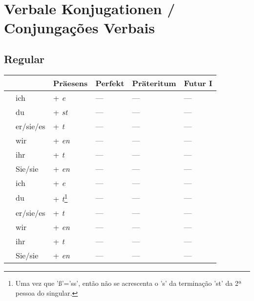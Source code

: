 \chapter{Verbale Konjugationen / Conjungações Verbais}\label{chapter:verben}

    \section{Regular}\label{section:verben:regular}

        \begin{longtabu}to 
            \toprule
            && \textbf{Präesens} & \textbf{Perfekt} & \textbf{Präteritum} & \textbf{Futur I}\\ \toprule \endhead
                & ich &  + \textit{e} & --- & --- & ---\\ \hline
                & du &  + \textit{st} & --- & --- & ---\\ \hline
                & er/sie/es &  + \textit{t} & --- & --- & ---\\ \hline
                & wir &  + \textit{en} & --- & --- & ---\\ \hline
                & ihr &  + \textit{t} & --- & --- & ---\\ \hline
                & Sie/sie &  + \textit{en} & --- & --- & ---\\ \hline
            \toprule
                 & ich &  + \textit{e} & --- & --- & ---\\ 
                & du &  + \textit{t}\footnote{Uma vez que 'ß'='ss', então não se acrescenta o 's' da terminação 'st' da 2ª pessoa do singular.} & --- & --- & ---\\ 
                & er/sie/es &  + \textit{t} & --- & --- & ---\\ 
                & wir &  + \textit{en} & --- & --- & ---\\ 
                & ihr &  + \textit{t} & --- & --- & ---\\ 
                & Sie/sie &  + \textit{en} & --- & --- & ---\\ 

\end{longtabu}
